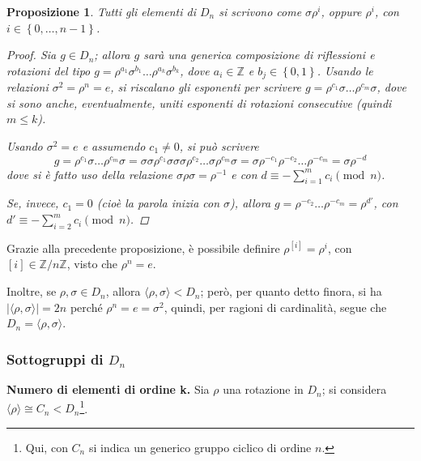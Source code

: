 \documentclass[11pt]{scrartcl}
\theoremstyle{style1}
\newtheorem{prop}{Proposizione}[section]
\numberwithin{equation}{subsection}
\renewcommand{\textbf}[1]{\textsf{\bfseries #1}}
\begin{document}
\begin{prop}\label{dnitems}
	Tutti gli elementi di $D_n$ si scrivono come $\sigma \rho ^i$, oppure $\rho ^i$, con $i \in \left\{ 0,\ldots,n-1 \right\} $.
	\begin{proof}
	Sia $g \in D_n$; allora $g$ sar\`a una generica composizione di riflessioni e rotazioni del tipo $g= \rho ^{a_1} \sigma ^{b_1} \ldots \rho ^{a_k} \sigma ^{b_k} $, dove $a_i \in \mathbb{Z}$ e $b_j \in \left\{ 0,1 \right\} $. 
	Usando le relazioni $\sigma ^2 = \rho ^n = e$, si riscalano gli esponenti per scrivere $g = \rho ^{c_1} \sigma \ldots \rho ^{c_m} \sigma $, dove si sono anche, eventualmente, uniti esponenti di rotazioni consecutive (quindi $m\le k$).

	Usando $\sigma ^2 = e$ e assumendo $c_1\neq 0$, si pu\`o scrivere 
	\[
	g = \rho ^{c_1} \sigma \ldots \rho ^{c_m} \sigma = \sigma \sigma \rho ^{c_1} \sigma \sigma \sigma \rho ^{c_2} \ldots \sigma \rho ^{c_m} \sigma = \sigma \rho ^{-c_1} \rho ^{-c_2}  \ldots \rho ^{-c_m} = \sigma \rho ^{-d} 
	\] 
			dove si \`e fatto uso della relazione $\sigma \rho \sigma = \rho ^{-1} $ e con $d \equiv -\sum_{i=1}^{m} c_i \pmod{n} $.

			Se, invece, $c_1 = 0$ (cio\`e la \textit{parola} inizia con $\sigma $), allora $g = \rho ^{-c_2}\ldots \rho^{-c_m}  = \rho ^{d'}  $, con $d ' \equiv -\sum_{i=2}^{m} c_i \pmod{n} $.
			\end{proof}
\end{prop}
\noindent Grazie alla precedente proposizione, \`e possibile definire $\rho ^{[i]} = \rho ^i$, con $[i] \in \mathbb{Z} / n\mathbb{Z}$, visto che $\rho ^n = e$.

Inoltre, se $\rho ,\sigma  \in D_n$, allora $\langle \rho ,\sigma  \rangle< D_n$; per\`o, per quanto detto finora, si ha $\lvert \langle \rho ,\sigma  \rangle \rvert = 2n$ perch\'e $\rho ^n = e= \sigma ^2 $, quindi, per ragioni di cardinalit\`a, segue che $D_n = \langle \rho ,\sigma  \rangle$.

\subsubsection{Sottogruppi di $D_n$}
\hfill

\textbf{Numero di elementi di ordine k.} 
Sia $\rho $ una rotazione in $D_n$; si considera $\langle \rho  \rangle\cong C_n < D_n$\footnote{Qui, con $C_n$ si indica un generico gruppo ciclico di ordine $n$.}.
\end{document}

